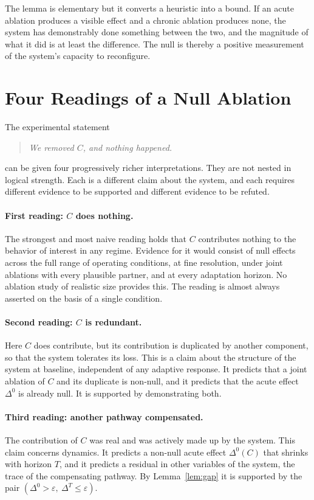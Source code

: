 \documentclass[11pt]{article}
\theoremstyle{definition}
\theoremstyle{remark}
\begin{document}
The lemma is elementary but it converts a heuristic into a bound. If an acute ablation produces a visible effect and a chronic ablation produces none, the system has demonstrably done something between the two, and the magnitude of what it did is at least the difference. The null is thereby a positive measurement of the system's capacity to reconfigure.

\section{Four Readings of a Null Ablation}\label{sec:readings}

The experimental statement
\begin{quote}
\emph{We removed $C$, and nothing happened.}
\end{quote}
can be given four progressively richer interpretations. They are not nested in logical strength. Each is a different claim about the system, and each requires different evidence to be supported and different evidence to be refuted.

\paragraph{First reading: $C$ does nothing.}
The strongest and most naive reading holds that $C$ contributes nothing to the behavior of interest in any regime. Evidence for it would consist of null effects across the full range of operating conditions, at fine resolution, under joint ablations with every plausible partner, and at every adaptation horizon. No ablation study of realistic size provides this. The reading is almost always asserted on the basis of a single condition.

\paragraph{Second reading: $C$ is redundant.}
Here $C$ does contribute, but its contribution is duplicated by another component, so that the system tolerates its loss. This is a claim about the structure of the system at baseline, independent of any adaptive response. It predicts that a joint ablation of $C$ and its duplicate is non-null, and it predicts that the acute effect $\Delta^0$ is already null. It is supported by demonstrating both.

\paragraph{Third reading: another pathway compensated.}
The contribution of $C$ was real and was actively made up by the system. This claim concerns dynamics. It predicts a non-null acute effect $\Delta^0(C)$ that shrinks with horizon $T$, and it predicts a residual in other variables of the system, the trace of the compensating pathway. By Lemma~\ref{lem:gap} it is supported by the pair $(\Delta^0>\varepsilon,\ \Delta^T\le\varepsilon)$.
\end{document}
